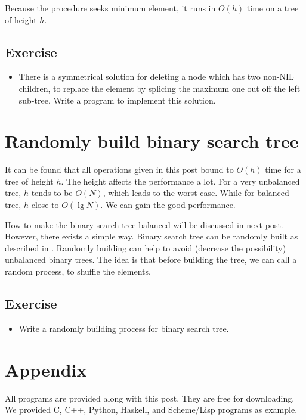 \documentclass{article}
\begin{document}
Because the procedure seeks minimum element, it runs in $O(h)$ time on 
a tree of height $h$.

\subsection*{Exercise}

\begin{itemize}
\item There is a symmetrical solution for deleting a node which has two
non-NIL children, to replace the element by splicing the maximum one out
off the left sub-tree. Write a program to implement this solution.
\end{itemize}

\section{Randomly build binary search tree}
It can be found that all operations given in this post bound to $O(h)$
time for a tree of height $h$. The height affects the performance 
a lot. For a very unbalanced tree, $h$ tends to be $O(N)$, which leads
to the worst case. While for balanced tree, $h$ close to $O(\lg N)$.
We can gain the good performance. 

How to make the binary search tree
balanced will be discussed in next post. However, there exists a simple
way. Binary search tree can be randomly built as described in \cite{CLRS}.
Randomly building can help to avoid (decrease the possibility) unbalanced
binary trees. The idea is that before building the tree, we can call a random
process, to shuffle the elements. 

\subsection*{Exercise}

\begin{itemize}
\item Write a randomly building process for binary search tree.
\end{itemize}


\section{Appendix} \label{appendix}
All programs are provided along with this post. They are free for downloading.
We provided C, C++, Python, Haskell, and Scheme/Lisp programs as example.
\end{document}
